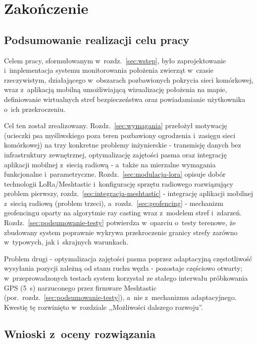 \newpage
\section{Zakończenie}
\label{sec:zakonczenie}

\subsection*{Podsumowanie realizacji celu pracy}

Celem pracy, sformułowanym w~rozdz.~\ref{sec:wstep}, było zaprojektowanie i~implementacja systemu
monitorowania położenia zwierząt w~czasie rzeczywistym, działającego w~obszarach pozbawionych
pokrycia sieci komórkowej, wraz z~aplikacją mobilną umożliwiającą wizualizację położenia na mapie,
definiowanie wirtualnych stref bezpieczeństwa oraz powiadamianie użytkownika o~ich przekroczeniu.

Cel ten został zrealizowany. Rozdz.~\ref{sec:wymagania} przełożył motywację (ucieczki psa myśliwskiego
poza teren pozbawiony ogrodzenia i~zasięgu sieci komórkowej) na trzy konkretne problemy inżynierskie -
transmisję danych bez infrastruktury zewnętrznej, optymalizację zajętości pasma oraz integrację
aplikacji mobilnej z~siecią radiową - a~także na mierzalne wymagania funkcjonalne i~parametryczne.
Rozdz.~\ref{sec:modulacja-lora} opisuje dobór technologii LoRa/Meshtastic i~konfigurację sprzętu
radiowego rozwiązujący problem pierwszy, rozdz.~\ref{sec:integracja-meshtastic} - integrację aplikacji
mobilnej z~siecią radiową (problem trzeci), a~rozdz.~\ref{sec:geofencing} - mechanizm geofencingu
oparty na algorytmie ray casting wraz z~modelem stref i~zdarzeń. Rozdz.~\ref{sec:podsumowanie-testy}
potwierdza w~oparciu o~testy terenowe, że zbudowany system poprawnie wykrywa przekroczenie granicy
strefy zarówno w~typowych, jak i~skrajnych warunkach.

Problem drugi - optymalizacja zajętości pasma poprzez adaptacyjną częstotliwość wysyłania pozycji
zależną od stanu ruchu węzła - pozostaje częściowo otwarty; w~przeprowadzonych testach system
korzystał ze stałego interwału próbkowania GPS (5~s) narzuconego przez firmware Meshtastic
(por.\ rozdz.~\ref{sec:podsumowanie-testy}), a~nie z~mechanizmu adaptacyjnego. Kwestię tę rozwinięto
w~rozdziale ,,Możliwości dalszego rozwoju''.

\subsection*{Wnioski z~oceny rozwiązania}

